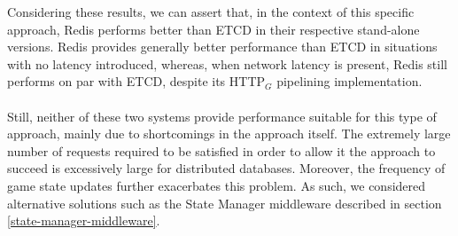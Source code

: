 Considering these results, we can assert that, in the context of this specific approach, Redis performs better than ETCD in their respective stand-alone versions. Redis provides generally better performance than ETCD in situations with no latency introduced, whereas, when network latency is present, Redis still performs on par with ETCD, despite its HTTP$_G$ pipelining implementation. \\ \\
Still, neither of these two systems provide performance suitable for this type of approach, mainly due to shortcomings in the approach itself. The extremely large number of requests required to be satisfied in order to allow it the approach to succeed is excessively large for distributed databases. Moreover, the frequency of game state updates further exacerbates this problem. As such, we considered alternative solutions such as the State Manager middleware described in section \ref{state-manager-middleware}. 

